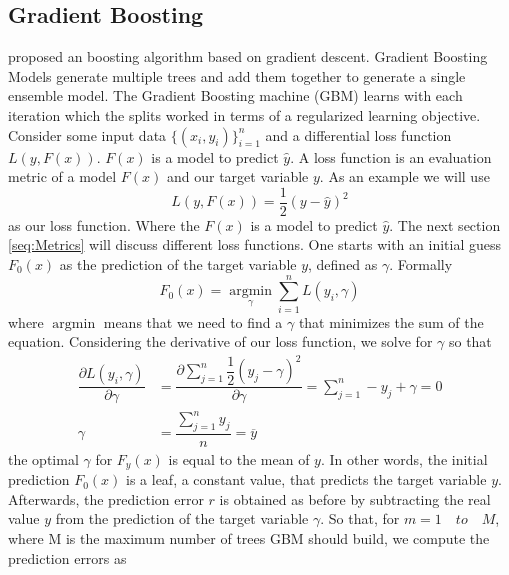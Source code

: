 \documentclass[12pt,a4paper]{article}
\begin{document}
\hypertarget{gradient-boosting}{%
\subsection{Gradient Boosting}\label{gradient-boosting}}

\textcite{Mason1999} proposed an boosting algorithm based on gradient descent. Gradient Boosting Models generate multiple trees and add them together to generate a single ensemble model. The Gradient Boosting machine (GBM) learns with each iteration which the splits worked in terms of a regularized learning objective. Consider some input data \(\{(x_i,y_i)\}^n_{i=1}\) and a differential loss function \(L(y,F(x))\). \(F(x)\) is a model to predict \(\hat{y}\). A loss function is an evaluation metric of a model \(F(x)\) and our target variable \(y\). As an example we will use
\begin{equation}
 L(y,F(x)) = \dfrac{1}{2}(y - \hat{y})^2
 \label{eq:reg_loss}
 \end{equation} as our loss function. Where the \(F(x)\) is a model to predict \(\hat{y}\). The next section \ref{seq:Metrics} will discuss different loss functions. One starts with an initial guess \(F_{0}(x)\) as the prediction of the target variable \(y\), defined as \(\gamma\). Formally
\begin{equation}
 F_{0}(x)=\underset{\gamma}{\operatorname{argmin}} \sum_{i=1}^{n} L\left(y_{i}, \gamma\right)
 \label{eq:ini_val}
 \end{equation} where \({\operatorname{argmin}}\) means that we need to find a \(\gamma\) that minimizes the sum of the equation. Considering the derivative of our loss function, we solve for \(\gamma\) so that
\begin{align}
 \dfrac{\partial L\left(y_{i}, \gamma\right)}{\partial \gamma} &= \dfrac{\partial \sum_{j=1}^n \dfrac{1}{2}(y_j - \gamma)^2}{\partial \gamma} = \sum_{j=1}^n -y_j + \gamma = 0 \\
 \gamma &= \dfrac{\sum_{j=1}^n y_j}{n} = \overline{y}
 \end{align}
the optimal \(\gamma\) for \(F_{y}(x)\) is equal to the mean of \(y\). In other words, the initial prediction \(F_0(x)\) is a leaf, a constant value, that predicts the target variable \(y\). Afterwards, the prediction error \(r\) is obtained as before by subtracting the real value \(y\) from the prediction of the target variable \(\gamma\). So that, for \(m = 1 \quad to \quad M\), where M is the maximum number of trees GBM should build, we compute the prediction errors as
\end{document}
